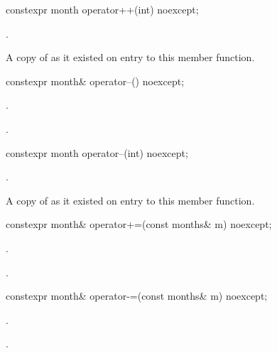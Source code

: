 %
\begin{itemdecl}
constexpr month operator++(int) noexcept;
\end{itemdecl}

\begin{itemdescr}
\pnum
\effects {}.

\pnum
\returns A copy of  as it existed on entry to this member function.
\end{itemdescr}

%
\begin{itemdecl}
constexpr month& operator--() noexcept;
\end{itemdecl}

\begin{itemdescr}
\pnum
\effects {}.

\pnum
\returns {}.
\end{itemdescr}

%
\begin{itemdecl}
constexpr month operator--(int) noexcept;
\end{itemdecl}

\begin{itemdescr}
\pnum
\effects {}.

\pnum
\returns A copy of  as it existed on entry to this member function.
\end{itemdescr}

%
\begin{itemdecl}
constexpr month& operator+=(const months& m) noexcept;
\end{itemdecl}

\begin{itemdescr}
\pnum
\effects {}.

\pnum
\returns {}.
\end{itemdescr}

%
\begin{itemdecl}
constexpr month& operator-=(const months& m) noexcept;
\end{itemdecl}

\begin{itemdescr}
\pnum
\effects {}.

\pnum
\returns {}.
\end{itemdescr}

